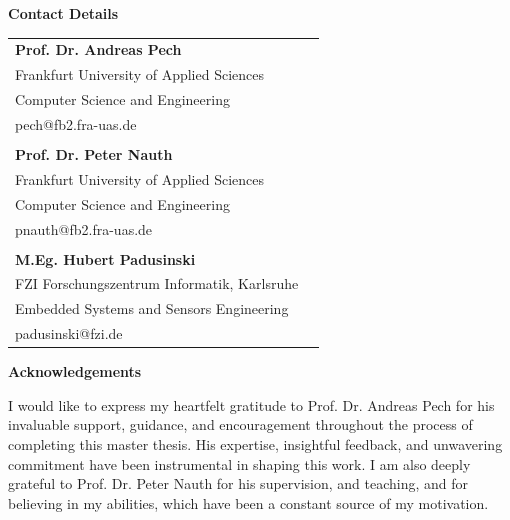 {%
\begin{titlepage}
	\vspace*{\fill}
    \begin{center}
    {\Large\textbf{Contact Details}} \\ \vspace{4em}
    \begin{tabular}{@{}ll@{}}
    \textbf{Prof. Dr. Andreas Pech} & \\
    Frankfurt University of Applied Sciences & \\
    Computer Science and Engineering & \\
    pech@fb2.fra-uas.de & \\
    \vspace{0.5em} \\
    \textbf{Prof. Dr. Peter Nauth} & \\
    Frankfurt University of Applied Sciences & \\
    Computer Science and Engineering & \\
    pnauth@fb2.fra-uas.de & \\
    \vspace{0.5em} \\
    \textbf{M.Eg. Hubert Padusinski} & \\
    FZI Forschungszentrum Informatik, Karlsruhe & \\
    Embedded Systems and Sensors Engineering & \\
    padusinski@fzi.de & \\
    \end{tabular}
    \end{center}
    \vspace*{\fill}
\end{titlepage}


\begin{titlepage}
	\vspace*{\fill}
	{\Large\textbf{Acknowledgements}\par}\bigskip%
    I would like to express my heartfelt gratitude to Prof. Dr. Andreas Pech for his invaluable support, guidance, and encouragement throughout the process of completing this master thesis. His expertise, insightful feedback, and unwavering commitment have been instrumental in shaping this work. I am also deeply grateful to Prof. Dr. Peter Nauth for his supervision, and teaching, and for believing in my abilities, which have been a constant source of my motivation.
    

\end{titlepage}}
